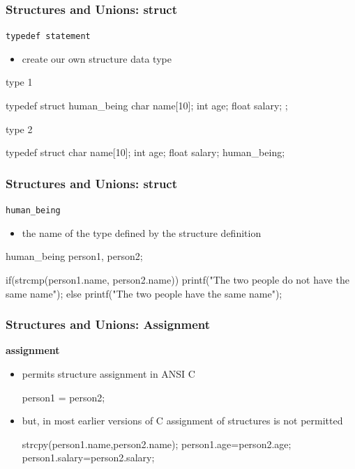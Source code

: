 \documentclass[newPxFont,sthlmFooter,nooffset]{beamer}
\begin{document}
\begin{frame}[t, fragile]
  \frametitle{Structures and Unions: struct}
\texttt{typedef statement}
\begin{itemize}
\item create our own structure data type
\end{itemize}

type 1
\begin{codedef}
typedef struct human_being { 
    char name[10];
    int age;
    float salary;
};
\end{codedef}

type 2
\begin{codedef}
typedef struct { 
    char name[10]; 
    int age;
    float salary;
} human_being;
\end{codedef}
\end{frame}


\begin{frame}[t, fragile]
  \frametitle{Structures and Unions: struct}
\texttt{human\_being}  
\begin{itemize}
\item the name of the type defined by the structure definition
\end{itemize}

\begin{codedef}
human_being person1, person2;

if(strcmp(person1.name, person2.name)) 
    printf("The two people do not have the same name\n");
else
    printf("The two people have the same name\n");
\end{codedef}
\end{frame}


\begin{frame}[t, fragile]
  \frametitle{Structures and Unions: Assignment}
\textbf{assignment}
\begin{itemize}
\item permits structure assignment in ANSI C

\begin{codedef}
  person1 = person2;
\end{codedef}
\item but, in most earlier versions of C assignment of structures is not permitted
\begin{codedef}
   strcpy(person1.name,person2.name); 
   person1.age=person2.age; 
   person1.salary=person2.salary;    
\end{codedef}
\end{itemize}
\end{frame}
\end{document}
